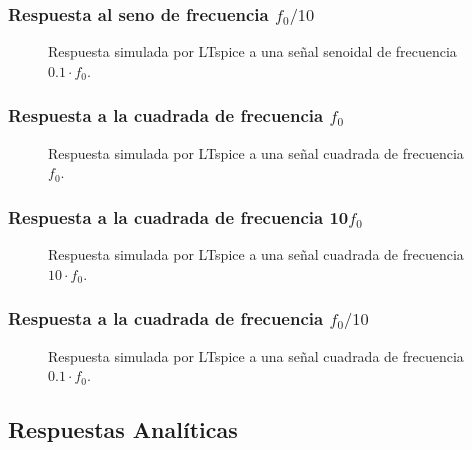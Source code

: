 \documentclass[10pt,a4paper]{article}
\begin{document}
    \subsubsection{Respuesta al seno de frecuencia $f_0/10$}
    \begin{figure}[H]
        \centering
        \scalebox{0.85}{}
        \caption{Respuesta simulada por LTspice a una señal senoidal de frecuencia $0.1 \cdot f_0$.}
        \label{fig}
    \end{figure}


    \subsubsection{Respuesta a la cuadrada de frecuencia $f_0$}
    \begin{figure}[H]
        \centering
        \scalebox{0.85}{}
        \caption{Respuesta simulada por LTspice a una señal cuadrada de frecuencia $f_0$.}
        \label{fig}
    \end{figure}

    \subsubsection{Respuesta a la cuadrada de frecuencia 10\cdot $f_0$}
    \begin{figure}[H]
        \centering
        \scalebox{0.85}{}
        \caption{Respuesta simulada por LTspice a una señal cuadrada de frecuencia $10 \cdot f_0$.}
        \label{fig}
    \end{figure}

    \subsubsection{Respuesta a la cuadrada de frecuencia $f_0/10$}
    \begin{figure}[H]
        \centering
        \scalebox{0.85}{}
        \caption{Respuesta simulada por LTspice a una señal cuadrada de frecuencia $0.1 \cdot f_0$.}
        \label{fig}
    \end{figure}



    \subsection{Respuestas Analíticas}
\end{document}
